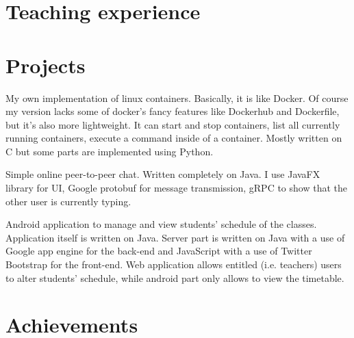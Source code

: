 \documentclass[10pt,a4paper,sans]{moderncv} %
\begin{document}
\section{Teaching experience}


\section{Projects}

{My own implementation of linux containers. Basically, it is like Docker. Of course my version lacks some of docker's fancy features like Dockerhub and Dockerfile, but it's also more lightweight.
It can start and stop containers, list all currently running containers, execute a command inside of a container. 
Mostly written on C but some parts are implemented using Python.}

{Simple online peer-to-peer chat. Written completely on Java. I use JavaFX library for UI, Google protobuf for message transmission, gRPC to show that the other user is currently typing.}

{Android application to manage and view students' schedule of the classes. Application itself is written on Java. Server part
is written on Java with a use of Google app engine for the back-end and JavaScript with a use of Twitter Bootstrap for the front-end. Web application allows entitled (i.e. teachers) users to alter students'
schedule, while android part only allows to view the timetable.}


\section{Achievements}
\end{document}
